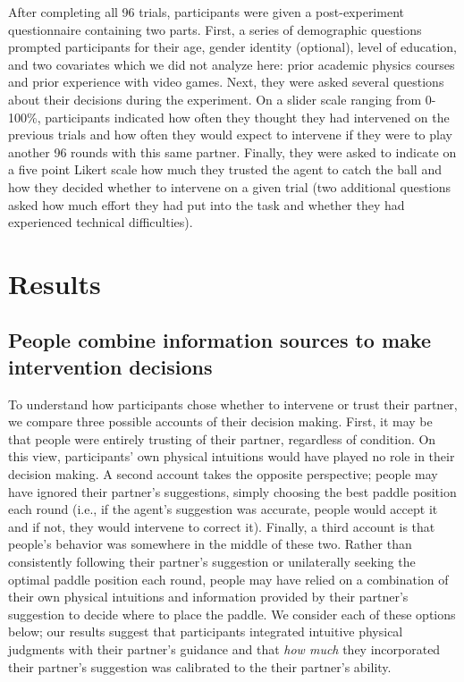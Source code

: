\documentclass[10pt,letterpaper]{article}
\begin{document}
After completing all 96 trials, participants were given a post-experiment questionnaire containing two parts. First, a series of demographic questions prompted participants for their age, gender identity (optional), level of education, and two covariates which we did not analyze here: prior academic physics courses and prior experience with video games. Next, they were asked several questions about their decisions during the experiment. On a slider scale ranging from 0-100\%, participants indicated how often they thought they had intervened on the previous trials and how often they would expect to intervene if they were to play another 96 rounds with this same partner. Finally, they were asked to indicate on a five point Likert scale how much they trusted the agent to catch the ball and how they decided whether to intervene on a given trial (two additional questions asked how much effort they had put into the task and whether they had experienced technical difficulties).



\section{Results}

\subsection{People combine information sources to make intervention decisions}

To understand how participants chose whether to intervene or trust their partner, we compare three possible accounts of their decision making. First, it may be that people were entirely trusting of their partner, regardless of condition. On this view, participants' own physical intuitions would have played no role in their decision making. A second account takes the opposite perspective; people may have ignored their partner's suggestions, simply choosing the best paddle position each round (i.e., if the agent's suggestion was accurate, people would accept it and if not, they would intervene to correct it). Finally, a third account is that people's behavior was somewhere in the middle of these two. Rather than consistently following their partner's suggestion or unilaterally seeking the optimal paddle position each round, people may have relied on a combination of their own physical intuitions and information provided by their partner's suggestion to decide where to place the paddle. We consider each of these options below; our results suggest that participants integrated intuitive physical judgments with their partner's guidance and that \textit{how much} they incorporated their partner's suggestion was calibrated to the their partner's ability.
\end{document}
